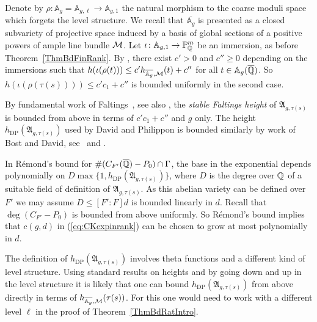 Denote by $\rho \colon \mathbb{A}_g = \mathbb{A}_{g,\ell} \rightarrow
\mathbb{A}_{g,1}$ the natural morphism to the coarse moduli space which forgets the level structure.
We recall that
$\overline{\mathbb{A}_g}$ %
is presented as a closed subvariety
of
projective space induced by a basis of global sections of a positive
powers of ample line bundle ${\mathcal M}$. Let
$\iota\colon\mathbb{A}_{g,1}\rightarrow{\mathbb{P}}_{\mathbb{Q}}^m$ be an
immersion, as before Theorem~\ref{ThmBdFinRank}.
By 
\cite[Lemma~4]{Silverman:heightest11}, there exist $c' > 0 $ and $c''
\ge 0$ depending on the immersions such that
$h(\iota(\rho(t))) \le c'
h_{\overline{\mathbb{A}_g},{\mathcal M}}(t) + c''$ for all $t\in
\mathbb{A}_g({\overline{\mathbb{Q}}})$.
So $h(\iota(\rho(\tau(s)))) \le c'c_1+c''$
is bounded uniformly in the second case.

By fundamental work of Faltings~\cite[$\mathsection 3$ including
 the proof of Lemma~3]{Faltings:ES}, see also
\cite[the remarks below Proposition~V.4.4 and Proposition~V.4.5]{FaltingsChai}, the \textit{stable Faltings height} of
$\mathfrak{A}_{g,\tau(s)}$ is bounded from above in terms of
$c'c_1+c''$ and $g$ only.
The height $h_{\mathrm{DP}}(\mathfrak{A}_{g,\tau(s)})$ used by David and
Philippon is bounded similarly by work of Bost and David,
see~\cite[Corollaire~6.9]{DPvarabII} and \cite{Pazuki:12}. 

In R\'emond's bound  \cite[page 643]{DPvarabII}
for $\#(C_{F'}({\overline{\mathbb{Q}}})-P_0)\cap \Gamma$,
the base in the exponential depends polynomially on 
$D\max\{1,h_{\mathrm{DP}}(\mathfrak{A}_{g,\tau(s)})\}$,
where $D$ is the degree over
${\mathbb{Q}}$ of a suitable field of definition of $\mathfrak{A}_{g,\tau(s)}$.
As this abelian variety can be defined over $F'$ we may assume $D\le
[F':F]d$ is bounded linearly in $d$.
Recall that $\deg (C_{F'}-P_0)$ is bounded from above uniformly. 
So R\'emond's bound implies that  $c(g,d)$
in (\ref{eq:CKexpinrank}) can be chosen to grow at most
polynomially in $d$.

The definition of $h_{\mathrm{DP}}(\mathfrak{A}_{g,\tau(s)})$
involves  theta functions and a different kind of level structure.
Using standard results on heights and by
going down and up in the level structure it is likely that one can
bound $h_{\mathrm{DP}}(\mathfrak{A}_{g,\tau(s)})$ from above directly in terms of
$h_{\overline{\mathbb{A}_g},{\mathcal M}}(\tau(s))$. For this one would need to
work with a different level $\ell$ in the proof of
Theorem~\ref{ThmBdRatIntro}.

